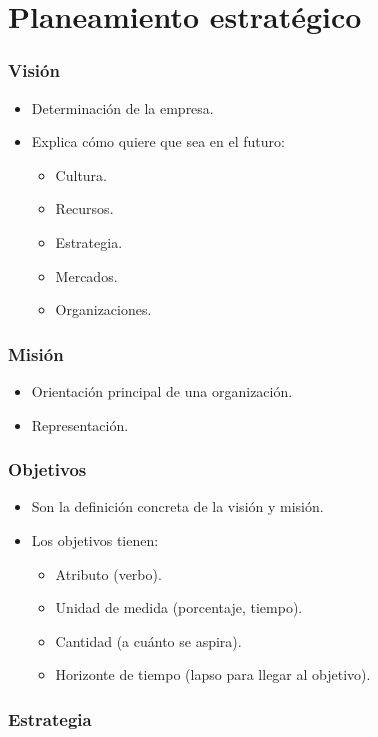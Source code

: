 \documentclass[9pt, spanish, a5paper]{article}
\begin{document}
\part{Planeamiento estratégico}

\section{Visión}
	\begin{itemize}
		\item Determinación de la empresa.
		\item Explica cómo quiere que sea en el futuro:
		\begin{itemize}
			\item Cultura.
			\item Recursos.
			\item Estrategia.
			\item Mercados.
			\item Organizaciones.
		\end{itemize}
	\end{itemize}

\section{Misión}
\begin{itemize}
	\item Orientación principal de una organización.
	\item Representación.
\end{itemize}

\section{Objetivos}
\begin{itemize}
	\item Son la definición concreta de la visión y misión.
	\item Los objetivos tienen:
	\begin{itemize}
		\item Atributo (verbo).
		\item Unidad de medida (porcentaje, tiempo).
		\item Cantidad (a cuánto se aspira).
		\item Horizonte de tiempo (lapso para llegar al objetivo).
	\end{itemize}
\end{itemize}

\section{Estrategia}
\end{document}
